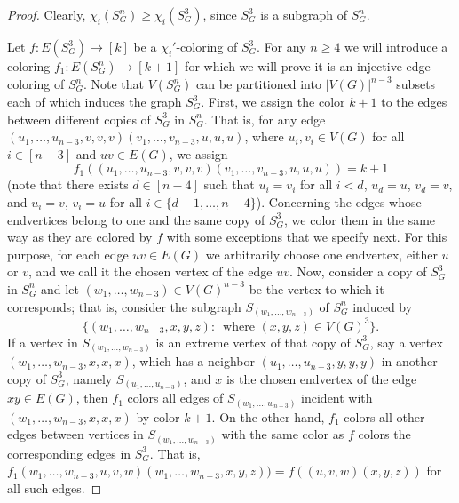 \documentclass[10pt,a4paper]{amsart}
\begin{document}
\begin{proof}
Clearly, $\chi_i(S_G^n)\geq \chi_i(S_G^3)$, since $S_G^3$ is a subgraph of $S_G^n$.

Let $f:E(S_G^3)\rightarrow [k]$ be a $\chi_i'$-coloring of $S_G^3$. For any $n\ge 4$ we will introduce a coloring $f_1:E(S_G^n)\rightarrow [k+1]$ for which we will prove it is an injective edge coloring of $S_G^n$. Note that $V(S_G^n)$ can be partitioned into $|V(G)|^{n-3}$ subsets each of which induces the graph $S_G^3$.  First, we assign the color $k+1$ to the edges between different copies of $S_G^3$ in $S_G^n$. That is, for any edge $(u_1,\ldots,u_{n-3},v,v,v)(v_1,\ldots,v_{n-3},u,u,u)$, where $u_i,v_i\in V(G)$ for all $i\in [n-3]$ and $uv\in E(G)$, we assign $$f_1((u_1,\ldots,u_{n-3},v,v,v)(v_1,\ldots,v_{n-3},u,u,u))=k+1$$ 
(note that there exists $d\in [n-4]$ such that $u_i=v_i$ for all $i<d$, $u_d=u$, $v_d=v$, and $u_i=v$, $v_i=u$ for all $i\in\{d+1,\ldots,n-4\}$).
Concerning the edges whose endvertices belong to one and the same copy of $S_G^3$, we color them in the same way as they are colored by $f$ with some exceptions that we specify next. For this purpose, for each edge $uv\in E(G)$ we arbitrarily choose one endvertex, either $u$ or $v$, and we call it the chosen vertex of the edge $uv$. Now, consider a copy of $S_G^3$ in $S_G^n$ and let $(w_1,\ldots,w_{n-3})\in V(G)^{n-3}$ be the vertex to which it corresponds; that is, consider the subgraph $S_{(w_1,\ldots,w_{n-3})}$ of $S_G^n$ induced by $$\{(w_1,\ldots,w_{n-3},x,y,z):\, \textrm{ where }(x,y,z)\in V(G)^3\}.$$
If a vertex in $S_{(w_1,\ldots,w_{n-3})}$ is an extreme vertex of that copy of $S_G^3$, say a vertex $(w_1,\ldots,w_{n-3},x,x,x)$, which has a neighbor $(u_1,\ldots,u_{n-3},y,y,y)$ in another copy of $S_G^3$, namely $S_{(u_1,\ldots,u_{n-3})}$, and $x$ is the chosen endvertex of the edge $xy\in E(G)$, then $f_1$ colors all edges of $S_{(w_1,\ldots,w_{n-3})}$ incident with $(w_1,\ldots,w_{n-3},x,x,x)$ by color $k+1$. On the other hand, $f_1$ colors all other edges between vertices in $S_{(w_1,\ldots,w_{n-3})}$ with the same color as $f$ colors the corresponding edges in $S_G^3$. That is, $f_1(w_1,\ldots,w_{n-3},u,v,w)(w_1,\ldots,w_{n-3},x,y,z))=f((u,v,w)(x,y,z))$ for all such edges. 


\end{proof}
\end{document}
